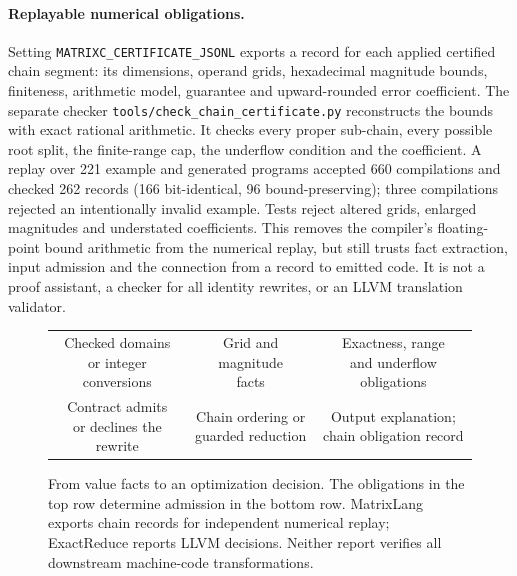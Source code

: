 \documentclass[acmsmall,review,anonymous,nonacm]{acmart}
\begin{document}
\paragraph{Replayable numerical obligations.}
Setting \texttt{MATRIXC\_CERTIFICATE\_JSONL} exports a record for each applied
certified chain segment: its dimensions, operand grids, hexadecimal magnitude
bounds, finiteness, arithmetic model, guarantee and upward-rounded error
coefficient. The separate checker \texttt{tools/check\_chain\_certificate.py}
reconstructs the bounds with exact rational arithmetic. It checks every proper
sub-chain, every possible root split, the finite-range cap, the underflow
condition and the coefficient. A replay over 221 example and generated programs
accepted 660 compilations and checked 262 records (166 bit-identical, 96
bound-preserving); three compilations rejected an intentionally invalid example.
Tests reject altered grids, enlarged magnitudes and understated coefficients.
This removes the compiler's floating-point bound
arithmetic from the numerical replay, but still trusts fact extraction, input
admission and the connection from a record to emitted code. It is not a proof
assistant, a checker for all identity rewrites, or an LLVM translation validator.

\begin{figure}[t]
\centering\footnotesize
\begin{tabular}{c@{\;$\longrightarrow$\;}c@{\;$\longrightarrow$\;}c}
\fbox{\parbox[c][2.8em][c]{.25\linewidth}{\centering Checked domains\\or integer conversions}} &
\fbox{\parbox[c][2.8em][c]{.25\linewidth}{\centering Grid and magnitude\\facts}} &
\fbox{\parbox[c][2.8em][c]{.25\linewidth}{\centering Exactness, range\\and underflow obligations}}\\[1.1em]
\fbox{\parbox[c][2.8em][c]{.25\linewidth}{\centering Contract admits\\or declines the rewrite}} &
\fbox{\parbox[c][2.8em][c]{.25\linewidth}{\centering Chain ordering or\\guarded reduction}} &
\fbox{\parbox[c][2.8em][c]{.25\linewidth}{\centering Output explanation;\\chain obligation record}}
\end{tabular}
\caption{From value facts to an optimization decision. The obligations in the
top row determine admission in the bottom row. MatrixLang exports chain
records for independent numerical replay; ExactReduce reports LLVM decisions.
Neither report verifies all downstream machine-code transformations.}
\label{fig:overview}
\end{figure}
\end{document}

